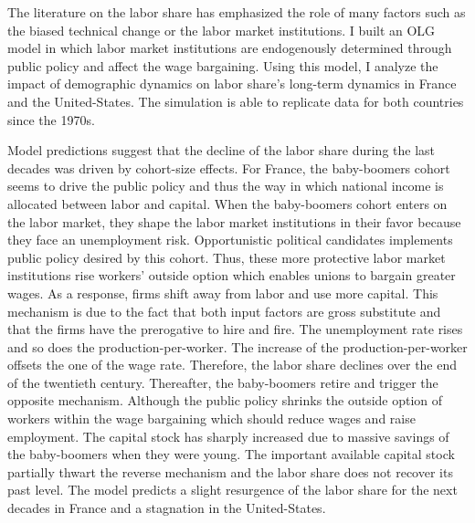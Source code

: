 The literature on the labor share has emphasized the role of many factors such as the biased technical change or the labor market institutions. I built an OLG model in which labor market institutions are endogenously determined through public policy and affect the wage bargaining. Using this model, I analyze the impact of demographic dynamics on labor share's long-term dynamics in France and the United-States. The simulation is able to replicate data for both countries since the 1970s.


Model predictions suggest that the decline of the labor share during the last decades was driven by cohort-size effects. 
For France, the baby-boomers cohort seems to drive the public policy and thus the way in which national income is allocated between labor and capital.
When the baby-boomers cohort enters on the labor market, they shape the labor market institutions in their favor because they face an unemployment risk. Opportunistic political candidates implements public policy desired by this cohort. 
Thus, these more protective labor market institutions rise workers' outside option which enables unions to bargain greater wages. 
As a response, firms shift away from labor and use more capital. This mechanism is due to the fact that both input factors are gross substitute and that the firms have the prerogative to hire and fire.
The unemployment rate rises and so does the production-per-worker. 
The increase of the production-per-worker offsets the one of the wage rate. 
Therefore, the labor share declines over the end of the twentieth century. 
Thereafter, the baby-boomers retire and trigger the opposite mechanism. 
Although the public policy shrinks the outside option of workers within the wage bargaining which should reduce wages and raise employment. 
The capital stock has sharply increased due to massive savings of the baby-boomers when they were young. 
The important available capital stock partially thwart the reverse mechanism and the labor share does not recover its past level.
The model predicts a slight resurgence of the labor share for the next decades in France and a stagnation in the United-States.


